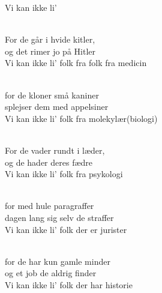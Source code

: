 \begin{song}{Vi kan ikke li'}


 \begin{SBVerse}
    \\
    For de går i hvide kitler,\\
    og det rimer jo på Hitler\\
    Vi kan ikke li' folk fra folk fra medicin
  \end{SBVerse}

 \begin{SBVerse}
    \\
    for de kloner små kaniner\\
    splejser dem med appelsiner\\
    Vi kan ikke li' folk fra molekylær(biologi)
  \end{SBVerse}

 \begin{SBVerse}
    \\
    For de vader rundt i læder,\\
    og de hader deres fædre\\
    Vi kan ikke li' folk fra psykologi
  \end{SBVerse}

 \begin{SBVerse}
    \\
    for med hule paragraffer\\
    dagen lang sig selv de straffer\\
    Vi kan ikke li' folk der er jurister
  \end{SBVerse}

 \begin{SBVerse}
    \\
    for de har kun gamle minder\\
    og et job de aldrig finder\\
    Vi kan ikke li' folk der har historie
  \end{SBVerse}


\end{song}

